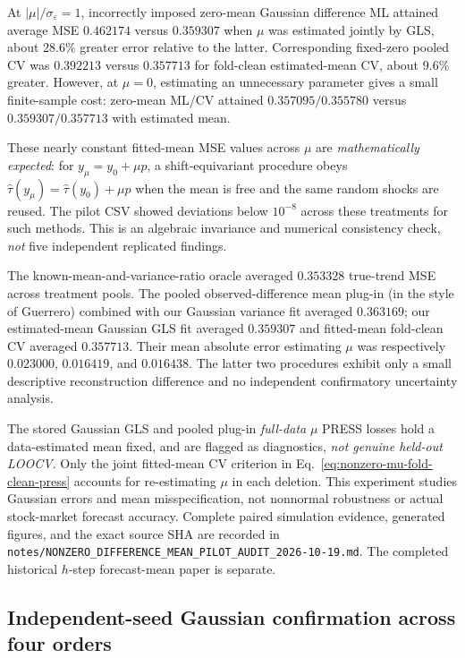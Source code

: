 \documentclass[11pt]{article}
\begin{document}
At $|\mu|/\sigma_\varepsilon=1$, incorrectly imposed
zero-mean Gaussian difference ML attained average MSE
$0.462174$ versus $0.359307$ when $\mu$ was estimated
jointly by GLS, about $28.6\%$ greater error relative to
the latter. Corresponding fixed-zero pooled CV was
$0.392213$ versus $0.357713$ for fold-clean estimated-mean
CV, about $9.6\%$ greater. However, at $\mu=0$,
estimating an unnecessary parameter gives a small
finite-sample cost: zero-mean ML/CV attained
$0.357095/0.355780$ versus
$0.359307/0.357713$ with estimated mean.

These nearly constant fitted-mean MSE values across
$\mu$ are \emph{mathematically expected}: for
$y_\mu=y_0+\mu p$, a shift-equivariant procedure obeys
$\widehat\tau(y_\mu)=\widehat\tau(y_0)+\mu p$
when the mean is free and the same random shocks are
reused. The pilot CSV showed deviations below
$10^{-8}$ across these treatments for such methods.
This is an algebraic invariance and numerical consistency
check, \emph{not} five independent replicated findings.

The known-mean-and-variance-ratio oracle averaged
$0.353328$ true-trend MSE across treatment pools.
The pooled observed-difference mean plug-in (in the
style of Guerrero) combined with our Gaussian variance
fit averaged $0.363169$; our estimated-mean Gaussian GLS
fit averaged $0.359307$ and fitted-mean fold-clean
CV averaged $0.357713$. Their mean absolute error
estimating $\mu$ was respectively $0.023000$,
$0.016419$, and $0.016438$.
The latter two procedures exhibit only a small
descriptive reconstruction difference and no
independent confirmatory uncertainty analysis.

The stored Gaussian GLS and pooled plug-in \emph{full-data}
$\mu$ PRESS losses hold a data-estimated mean fixed,
and are flagged as diagnostics, \emph{not genuine
held-out LOOCV}. Only the joint fitted-mean CV
criterion in Eq.~\eqref{eq:nonzero-mu-fold-clean-press}
accounts for re-estimating $\mu$ in each deletion.
This experiment studies Gaussian errors and mean
misspecification, not nonnormal robustness or actual
stock-market forecast accuracy. Complete paired
simulation evidence, generated figures, and the exact
source SHA are recorded in
\texttt{notes/NONZERO\_DIFFERENCE\_MEAN\_PILOT\_AUDIT\_2026-10-19.md}.
The completed historical $h$-step forecast-mean paper is
separate.

\subsection{Independent-seed Gaussian confirmation across four orders}
\end{document}
